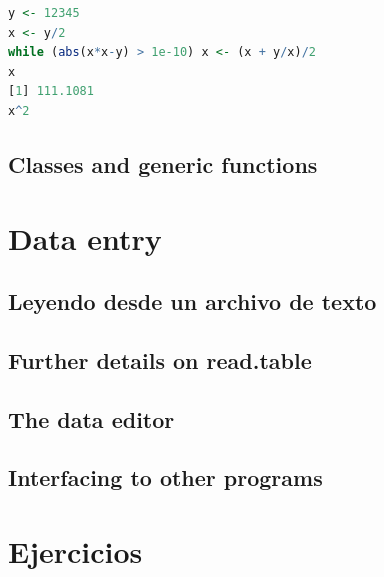 \begin{lstlisting}[language=R]
y <- 12345
x <- y/2
while (abs(x*x-y) > 1e-10) x <- (x + y/x)/2
x
[1] 111.1081
x^2
\end{lstlisting}

\newpage

\subsection{Classes and generic functions}

\section{Data entry}

\subsection{Leyendo desde un archivo de texto} \label{readtextfile}

\subsection{Further details on read.table}

\subsection{The data editor}

\subsection{Interfacing to other programs}

\section{Ejercicios}
